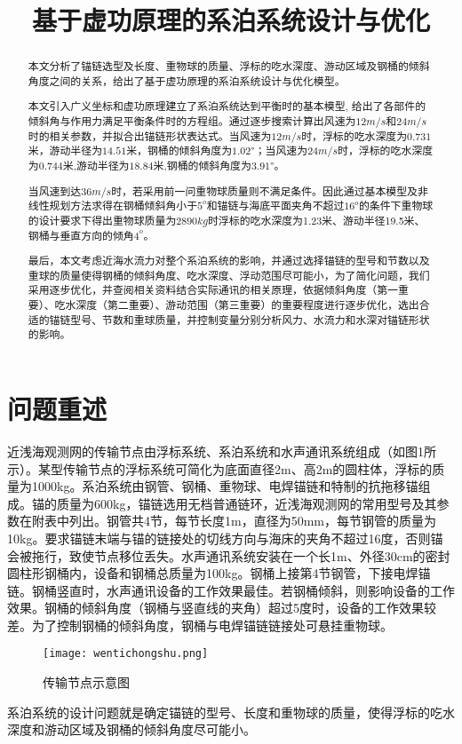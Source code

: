 \documentclass[withoutpreface,bwprint]{cumcmthesis} %
\title{基于虚功原理的系泊系统设计与优化}
\begin{document}
 \maketitle
\begin{abstract}

\par 本文分析了锚链选型及长度、重物球的质量、浮标的吃水深度、游动区域及钢桶的倾斜角度之间的关系，给出了基于虚功原理的系泊系统设计与优化模型。  
\par 本文引入广义坐标和虚功原理建立了系泊系统达到平衡时的基本模型, 给出了各部件的倾斜角与作用力满足平衡条件时的方程组。通过逐步搜索计算出风速为$12m/s$和$24m/s$时的相关参数，并拟合出锚链形状表达式。当风速为$12m/s$时，浮标的吃水深度为$0.731$米，游动半径为$14.51$米，钢桶的倾斜角度为$1.02°$；当风速为$24m/s$时，浮标的吃水深度为$0.744$米,游动半径为$18.84$米,钢桶的倾斜角度为$3.91°$。

\par 当风速到达$36m/s$时，若采用前一问重物球质量则不满足条件。因此通过基本模型及非线性规划方法求得在钢桶倾斜角小于$5^o$和锚链与海底平面夹角不超过$16^o$的条件下重物球的设计要求下得出重物球质量为$2890kg$时浮标的吃水深度为1.23米、游动半径19.5米、钢桶与垂直方向的倾角$4^o$。
\par 最后，本文考虑近海水流力对整个系泊系统的影响，并通过选择锚链的型号和节数以及重球的质量使得钢桶的倾斜角度、吃水深度、浮动范围尽可能小，为了简化问题，我们采用逐步优化，并查阅相关资料结合实际通讯的相关原理，依据倾斜角度（第一重要）、吃水深度（第二重要）、游动范围（第三重要）的重要程度进行逐步优化，选出合适的锚链型号、节数和重球质量，并控制变量分别分析风力、水流力和水深对锚链形状的影响。

\end{abstract}

\section{问题重述}

\par 近浅海观测网的传输节点由浮标系统、系泊系统和水声通讯系统组成（如图1所示）。某型传输节点的浮标系统可简化为底面直径2m、高2m的圆柱体，浮标的质量为1000kg。系泊系统由钢管、钢桶、重物球、电焊锚链和特制的抗拖移锚组成。锚的质量为600kg，锚链选用无档普通链环，近浅海观测网的常用型号及其参数在附表中列出。钢管共4节，每节长度1m，直径为50mm，每节钢管的质量为10kg。要求锚链末端与锚的链接处的切线方向与海床的夹角不超过16度，否则锚会被拖行，致使节点移位丢失。水声通讯系统安装在一个长1m、外径30cm的密封圆柱形钢桶内，设备和钢桶总质量为100kg。钢桶上接第4节钢管，下接电焊锚链。钢桶竖直时，水声通讯设备的工作效果最佳。若钢桶倾斜，则影响设备的工作效果。钢桶的倾斜角度（钢桶与竖直线的夹角）超过5度时，设备的工作效果较差。为了控制钢桶的倾斜角度，钢桶与电焊锚链链接处可悬挂重物球。
\begin{figure}[h]
\small
\centering
\texttt{[image: wentichongshu.png]}
\caption{传输节点示意图} \label{fig:wentichongshu}
\end{figure}
\par 系泊系统的设计问题就是确定锚链的型号、长度和重物球的质量，使得浮标的吃水深度和游动区域及钢桶的倾斜角度尽可能小。
\end{document}
